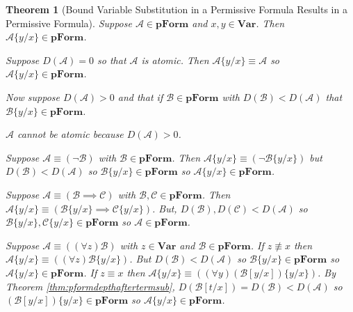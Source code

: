 \documentclass[12pt]{article}
\theoremstyle{break}
\theoremstyle{break}
\newtheorem{theorem}{Theorem}[section]
\theoremstyle{break}
\theoremstyle{break}
\theoremstyle{break}
\newtheorem{informal definition}[definition]{Informal Definition}
\newcommand{\mc}[1]{\mathcal{#1}}
\begin{document}
\begin{theorem}[Bound Variable Substitution in a Permissive Formula Results in a Permissive Formula]
Suppose $\mc{A}\in\textbf{pForm}$ and $x, y \in \textbf{Var}$. Then $\mc{A}\{y/x\}\in\textbf{pForm}$.

Suppose $D(\mc{A}) = 0$ so that $\mc{A}$ is atomic. Then $\mc{A}\{y/x\}\equiv \mc{A}$ so $\mc{A}\{y/x\} \in \textbf{pForm}$.

Now suppose $D(\mc{A}) >0$ and that if $\mc{B}\in\textbf{pForm}$ with $D(\mc{B}) < D(\mc{A})$ that $\mc{B}\{y/x\} \in \textbf{pForm}$.

$\mc{A}$ cannot be atomic because $D(\mc{A}) > 0$.

Suppose $\mc{A}\equiv (\lnot \mc{B})$ with $\mc{B}\in\textbf{pForm}$.
Then $\mc{A}\{y/x\} \equiv (\lnot \mc{B}\{y/x\})$ but $D(\mc{B})<D(\mc{A})$ so $\mc{B}\{y/x\}\in\textbf{pForm}$ so $\mc{A}\{y/x\}\in\textbf{pForm}$.

Suppose $\mc{A} \equiv (\mc{B}\implies \mc{C})$ with $\mc{B}, \mc{C}\in\textbf{pForm}$.
Then $\mc{A}\{y/x\} \equiv (\mc{B}\{y/x\} \implies \mc{C}\{y/x\})$.
But, $D(\mc{B}), D(\mc{C}) < D(\mc{A})$ so $\mc{B}\{y/x\}, \mc{C}\{y/x\}\in\textbf{pForm}$ so $\mc{A}\in\textbf{pForm}$.

Suppose $\mc{A}\equiv ((\forall z)\mc{B})$ with $z\in\textbf{Var}$ and $\mc{B}\in\textbf{pForm}$.
If $z\not \equiv x$ then $\mc{A}\{y/x\} \equiv ((\forall z)\mc{B}\{y/x\})$.
But $D(\mc{B}) < D(\mc{A})$ so $\mc{B}\{y/x\} \in \textbf{pForm}$ so $\mc{A}\{y/x\}\in\textbf{pForm}$.
If $z\equiv x$ then $\mc{A}\{y/x\} \equiv ((\forall y) (\mc{B}[y/x])\{y/x\})$.
By Theorem \ref{thm:pformdepthaftertermsub}, $D(\mc{B}[t/x]) = D(\mc{B}) < D(\mc{A})$ so $(\mc{B}[y/x])\{y/x\}\in\textbf{pForm}$ so $\mc{A}\{y/x\}\in\textbf{pForm}$.
\end{theorem}
\end{document}
